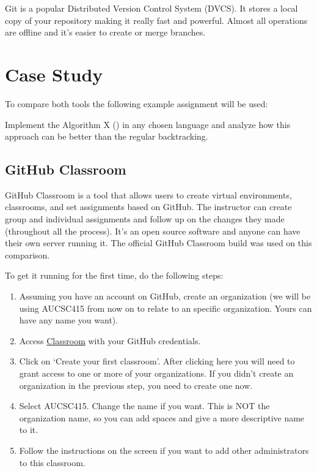 \documentclass[12pt]{article}
\begin{document}
Git is a popular Distributed Version Control System (DVCS). It stores a local copy of your repository making it really fast and powerful. Almost all operations are offline and it's easier to create or merge branches. \cite{git}


\section{Case Study}

To compare both tools the following example assignment will be used: 

Implement the Algorithm X (\cite{dancinglinks}) in any chosen language and analyze how this approach can be better than the regular backtracking.

\subsection{GitHub Classroom}

GitHub Classroom is a tool that allows users to create virtual environments, classrooms, and set assignments based on GitHub. The instructor can create group and individual assignments and follow up on the changes they made (throughout all the process). It's an open source software and anyone can have their own server running it. The official GitHub Classroom build was used on this comparison.

To get it running for the first time, do the following steps:

\begin{enumerate}

\item Assuming you have an account on GitHub, create an organization (we will be using AUCSC415 from now on to relate to an specific organization. Yours can have any name you want).

\item Access \href{https://classroom.github.com}{Classroom} with your GitHub credentials. 

\item Click on `Create your first classroom'. After clicking here you will need to grant access to one or more of your organizations. If you didn't create an organization in the previous step, you need to create one now.

\item Select AUCSC415. Change the name if you want. This is NOT the organization name, so you can add spaces and give a more descriptive name to it.

\item Follow the instructions on the screen if you want to add other administrators to this classroom.

\end{enumerate}
\end{document}

